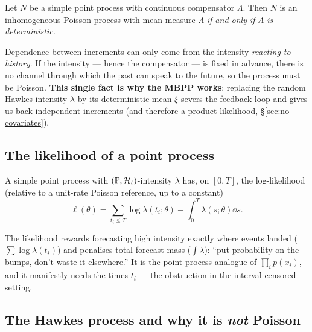 \begin{theorem}\label{thm:watanabe}
Let $N$ be a simple point process with continuous compensator $\Lambda$. Then $N$
is an inhomogeneous Poisson process with mean measure $\Lambda$ \emph{if and only
if $\Lambda$ is deterministic.}
\end{theorem}

\begin{intuition}
Dependence between increments can only come from the intensity \emph{reacting to
history}. If the intensity --- hence the compensator --- is fixed in advance, there
is no channel through which the past can speak to the future, so the process must
be Poisson. \textbf{This single fact is why the MBPP works}: replacing the random
Hawkes intensity $\lambda$ by its deterministic mean $\xi$ severs the feedback loop
and gives us back independent increments (and therefore a product likelihood,
\S\ref{sec:no-covariates}).
\end{intuition}

\subsection{The likelihood of a point process}

\begin{theorem}\label{thm:jacod}
A simple point process with $(\mathbb{P},\mathcal{H}_t)$-intensity $\lambda$ has, on $[0,T]$,
the log-likelihood (relative to a unit-rate Poisson reference, up to a constant)
\begin{equation}
\ell(\theta)=\sum_{t_i\le T}\log\lambda(t_i;\theta)-\int_0^T\lambda(s;\theta)\dd s .
\label{eq:ppll}
\end{equation}
\end{theorem}

\begin{intuition}
The likelihood rewards forecasting high intensity exactly where events landed
($\sum\log\lambda(t_i)$) and penalises total forecast mass ($\int\lambda$): ``put
probability on the bumps, don't waste it elsewhere.'' It is the point-process
analogue of $\prod_i p(x_i)$, and it manifestly needs the times $t_i$ --- the
obstruction in the interval-censored setting.
\end{intuition}

\subsection{The Hawkes process and why it is \emph{not} Poisson}

